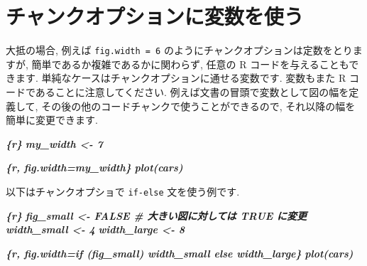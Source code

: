 \documentclass[
  11pt,
]{bxjsreport}
\newenvironment{Shaded}{\begin{snugshade}}{\end{snugshade}}
\newcommand{\InformationTok}[1]{\textcolor[rgb]{0.56,0.35,0.01}{\textbf{\textit{#1}}}}
\begin{document}
\begin{Shaded}
\end{Shaded}

\hypertarget{chunk-variable}{%
\section{チャンクオプションに変数を使う}\label{chunk-variable}}

大抵の場合, 例えば \texttt{fig.width = 6} のようにチャンクオプションは定数をとりますが, 簡単であるか複雑であるかに関わらず, 任意の R コードを与えることもできます. 単純なケースはチャンクオプションに通せる変数です. 変数もまた R コードであることに注意してください. 例えば文書の冒頭で変数として図の幅を定義して, その後の他のコードチャンクで使うことができるので, それ以降の幅を簡単に変更できます.

\begin{Shaded}
\begin{Highlighting}[]
\InformationTok{\textasciigrave{}\textasciigrave{}\textasciigrave{}\{r\}}
\InformationTok{my\_width \textless{}{-} 7}
\InformationTok{\textasciigrave{}\textasciigrave{}\textasciigrave{}}

\InformationTok{\textasciigrave{}\textasciigrave{}\textasciigrave{}\{r, fig.width=my\_width\}}
\InformationTok{plot(cars)}
\InformationTok{\textasciigrave{}\textasciigrave{}\textasciigrave{}}
\end{Highlighting}
\end{Shaded}

以下はチャンクオプショで \texttt{if-else} 文を使う例です.

\begin{Shaded}
\begin{Highlighting}[]
\InformationTok{\textasciigrave{}\textasciigrave{}\textasciigrave{}\{r\}}
\InformationTok{fig\_small \textless{}{-} FALSE  \# 大きい図に対しては TRUE に変更}
\InformationTok{width\_small \textless{}{-} 4}
\InformationTok{width\_large \textless{}{-} 8}
\InformationTok{\textasciigrave{}\textasciigrave{}\textasciigrave{}}

\InformationTok{\textasciigrave{}\textasciigrave{}\textasciigrave{}\{r, fig.width=if (fig\_small) width\_small else width\_large\}}
\InformationTok{plot(cars)}
\InformationTok{\textasciigrave{}\textasciigrave{}\textasciigrave{}}
\end{Highlighting}
\end{Shaded}
\end{document}
